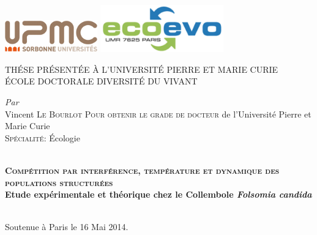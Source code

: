 
\begin{titlingpage}
\begin{Spacing}{1}
\begin{center}     

\includegraphics[width=0.3\textwidth]{0_Title/upmc.png}\hfill
\includegraphics[width=0.4\textwidth]{0_Title/LogoLabo.png}\\[1cm]
 
 \vspace{2cm}
 
\begin{Spacing}{1.5}
\textsc{\LARGE THÉSE PRÉSENTÉE À L'UNIVERSITÉ PIERRE ET MARIE
CURIE}\\[0.8cm]

\textsc{ÉCOLE DOCTORALE DIVERSITÉ DU VIVANT}
\end{Spacing} 
\vfill

\emph{Par}\\ 
Vincent \textsc{Le Bourlot} \vfill
\textsc{Pour obtenir le grade de docteur} de l'Université Pierre et Marie
Curie\\
\textsc{Spécialité}: \'Ecologie\\

\vfill


\HRule \\[0.2cm] 
{\textbf{\LARGE\textsc{Compétition par interférence, température et dynamique
des populations structurées}\\[0.7cm] \Large Etude expérimentale et théorique
chez le Collembole \textit{Folsomia candida}}}\\[0.2cm] \HRule \\ 

\vfill
\end{center} 
Soutenue à Paris le 16 Mai 2014.\\
\vfill

\begin{flushleft}
\begingroup
    \fontsize{11pt}{12pt}\selectfont



\end{flushleft}
\end{Spacing}
\end{titlingpage}
